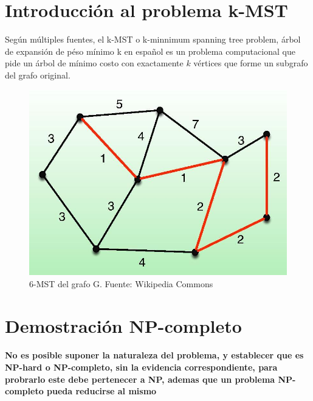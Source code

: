\documentclass[spanish,12pt]{elsarticle}
\begin{document}
\section{Introducción al problema k-MST}
Según múltiples fuentes\cite{3}\cite{5}, el k-MST o k-minnimum spanning tree problem, árbol de expansión de péso mínimo k en español es un problema computacional que pide un árbol de mínimo costo con exactamente $k$ vértices que forme un subgrafo del grafo original.
\begin{figure}[h]
    \centering
    \includegraphics[scale=0.45]{images/6-mst.jpg}
    \caption{6-MST del grafo G. Fuente: Wikipedia Commons}
    \label{fig:my_label}
\end{figure}


\section{Demostración NP-completo}
\paragraph{\textnormal{No es posible suponer la naturaleza del problema, y establecer que es NP-hard o NP-completo, sin la evidencia correspondiente, para probrarlo este debe pertenecer a NP, ademas que un problema NP-completo pueda reducirse al mismo}}
\end{document}
